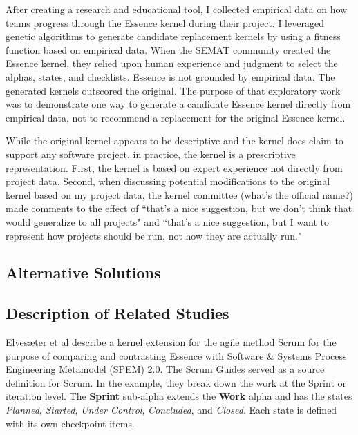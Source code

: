 \documentclass[preprint,12pt,3p]{elsarticle}
\begin{document}

After creating a research and educational tool, I collected empirical data on how teams progress through the Essence kernel during their project. I leveraged genetic algorithms to generate candidate replacement kernels by using a fitness function based on empirical data. When the SEMAT community created the Essence kernel, they relied upon human experience and judgment to select the alphas, states, and checklists. Essence is not grounded by empirical data. The generated kernels outscored the original. The purpose of that exploratory work was to demonstrate one way to generate a candidate Essence kernel directly from empirical data, not to recommend a replacement for the original Essence kernel. \cite{SCSE2015}

While the original kernel appears to be descriptive and the kernel does claim to support any software project, in practice, the kernel is a prescriptive representation. First, the kernel is based on expert experience not directly from project data. Second, when discussing potential modifications to the original kernel based on my project data, the kernel committee (what's the official name?) made comments to the effect of ``that's a nice suggestion, but we don't think that would generalize to all projects" and ``that's a nice suggestion, but I want to represent how projects should be run, not how they are actually run." 

\subsection{Alternative Solutions}

\subsection{Description of Related Studies}

Elves{\ae}ter et al \cite{Elvesaeter2013} describe a kernel extension for the agile method Scrum \cite{Schwaber2001} for the purpose of comparing and contrasting Essence with Software \& Systems Process Engineering Metamodel (SPEM) 2.0. The Scrum Guides \cite{ScrumGuide} served as a source definition for Scrum. 
 In the example, they break down the work at the Sprint or iteration level. The \textbf{Sprint} sub-alpha extends the \textbf{Work} alpha and has the states \textit{Planned}, \textit{Started}, \textit{Under Control}, \textit{Concluded}, and \textit{Closed}. Each state is defined with its own checkpoint items. 
\end{document}
